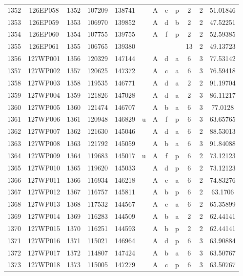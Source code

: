 \begin{tabular}{|*{12}{c|}}
1352 & 126EP058 & 1352 & 107209 & 138741 &  & A & e & p & 2 & 2 & 51.01846 \\ 
1353 & 126EP059 & 1353 & 106970 & 139852 &  & A & d & b & 2 & 2 & 47.52251 \\ 
1354 & 126EP060 & 1354 & 107755 & 139755 &  & A & f & p & 2 & 2 & 52.59385 \\ 
1355 & 126EP061 & 1355 & 106765 & 139380 &  &  &  &  & 13 & 2 & 49.13723 \\ 
1356 & 127WP001 & 1356 & 120329 & 147144 &  & A & d & a & 6 & 3 & 77.53142 \\ 
1357 & 127WP002 & 1357 & 120625 & 147372 &  & A & c & a & 6 & 3 & 76.59418 \\ 
1358 & 127WP003 & 1358 & 119535 & 146771 &  & A & d & a & 2 & 2 & 91.19704 \\ 
1359 & 127WP004 & 1359 & 121826 & 147028 &  & A & d & a & 2 & 3 & 86.11217 \\ 
1360 & 127WP005 & 1360 & 121474 & 146707 &  & A & b & a & 6 & 3 & 77.0128 \\ 
1361 & 127WP006 & 1361 & 120948 & 146829 & u & A & f & p & 6 & 3 & 63.65765 \\ 
1362 & 127WP007 & 1362 & 121630 & 145046 &  & A & d & a & 6 & 2 & 88.53013 \\ 
1363 & 127WP008 & 1363 & 121792 & 145059 &  & A & b & a & 6 & 3 & 91.84088 \\ 
1364 & 127WP009 & 1364 & 119683 & 145017 & u & A & f & p & 6 & 2 & 73.12123 \\ 
1365 & 127WP010 & 1365 & 119620 & 145033 &  & A & d & p & 6 & 2 & 73.12123 \\ 
1366 & 127WP011 & 1366 & 116934 & 146218 &  & A & c & a & 6 & 2 & 74.83276 \\ 
1367 & 127WP012 & 1367 & 116757 & 145811 &  & A & b & p & 6 & 2 & 63.1706 \\ 
1368 & 127WP013 & 1368 & 117532 & 144567 &  & A & c & a & 6 & 2 & 65.35899 \\ 
1369 & 127WP014 & 1369 & 116283 & 144509 &  & A & b & a & 2 & 2 & 62.44141 \\ 
1370 & 127WP015 & 1370 & 116251 & 144593 &  & A & b & p & 2 & 2 & 62.44141 \\ 
1371 & 127WP016 & 1371 & 115021 & 146964 &  & A & d & p & 6 & 3 & 63.90884 \\ 
1372 & 127WP017 & 1372 & 114807 & 147424 &  & A & b & a & 6 & 3 & 63.50767 \\ 
1373 & 127WP018 & 1373 & 115005 & 147279 &  & A & c & p & 6 & 3 & 63.50767 \\ 

\end{tabular}
